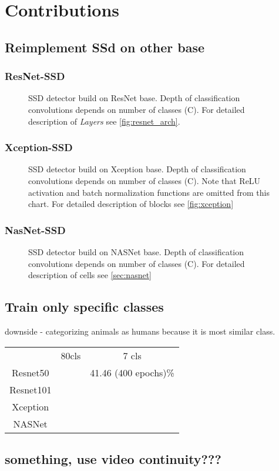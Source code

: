 \chapter{Contributions}
 \cite{bib:benchmark}

\section{Reimplement SSd on other base}
\subsection{ResNet-SSD}
\begin{figure}
    \label{fig:resnetSSD}
    \resnetSSD
    \caption{SSD detector build on ResNet base. Depth of classification convolutions depends on number of classes (C). For detailed description of \textit{Layers} see \cref{fig:resnet_arch}.}
\end{figure}

\subsection{Xception-SSD}


\begin{figure}
    \label{fig:resnetSSD}
    \xceptionSSD
    \caption{SSD detector build on Xception base. Depth of classification convolutions depends on number of classes (C). Note that ReLU activation and batch normalization functions are omitted from this chart. For detailed description of blocks see \cref{fig:xception}}
\end{figure}

\subsection{NasNet-SSD}

\begin{figure}
    \label{fig:nasnetSSD}
    \nasnetSSD
    \caption{SSD detector build on NASNet base. Depth of classification convolutions depends on number of classes (C). For detailed description of cells see \cref{sec:nasnet}}
\end{figure}


\section{Train only specific classes}
downside - categorizing animals as humans because it is most similar class.
\begin{tabular}{c|c|c}
     & 80cls & 7 cls \\
    Resnet50 & & 41.46 (400 epochs)\%\\
    Resnet101 & & \\
    Xception & & \\
    NASNet & & \\
\end{tabular}

\section{something, use video continuity???}